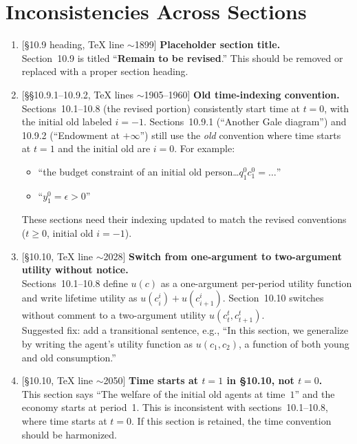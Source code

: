 \documentclass[11pt]{article}
\newcommand{\Err}[1]{\textbf{\color{red}#1}}
\newcommand{\loc}[1]{\textsf{\small [#1]}}
\begin{document}
\section{Inconsistencies Across Sections}

\begin{enumerate}[label=\textbf{I\arabic*.}, leftmargin=2em]

\item \loc{\S10.9 heading, TeX line $\sim$1899}
\textbf{Placeholder section title.}\\
Section~10.9 is titled ``\Err{Remain to be revised}.'' This should be removed or replaced with a proper section heading.

\item \loc{\S\S10.9.1--10.9.2, TeX lines $\sim$1905--1960}
\textbf{Old time-indexing convention.}\\
Sections~10.1--10.8 (the revised portion) consistently start time at $t=0$, with the initial old labeled $i=-1$.
Sections~10.9.1 (``Another Gale diagram'') and 10.9.2 (``Endowment at $+\infty$'') still use the \emph{old} convention where time starts at $t=1$ and the initial old are $i=0$.
For example:
\begin{itemize}
  \item ``the budget constraint of an initial old person\ldots $q_1^0 c_1^0 = \ldots$''
  \item ``$y^0_1 = \epsilon > 0$''
\end{itemize}
These sections need their indexing updated to match the revised conventions ($t\geq 0$, initial old $i=-1$).

\item \loc{\S10.10, TeX line $\sim$2028}
\textbf{Switch from one-argument to two-argument utility without notice.}\\
Sections~10.1--10.8 define $u(c)$ as a one-argument per-period utility function and write lifetime utility as $u(c_i^i) + u(c_{i+1}^i)$.
Section~10.10 switches without comment to a two-argument utility $u(c_t^t, c_{t+1}^t)$.\\
Suggested fix: add a transitional sentence, e.g., ``In this section, we generalize by writing the agent's utility function as $u(c_1,c_2)$, a function of both young and old consumption.''

\item \loc{\S10.10, TeX line $\sim$2050}
\textbf{Time starts at $t=1$ in \S10.10, not $t=0$.}\\
This section says ``The welfare of the initial old agents at time~$1$'' and the economy starts at period~1. This is inconsistent with sections~10.1--10.8, where time starts at $t=0$. If this section is retained, the time convention should be harmonized.


\end{enumerate}
\end{document}
